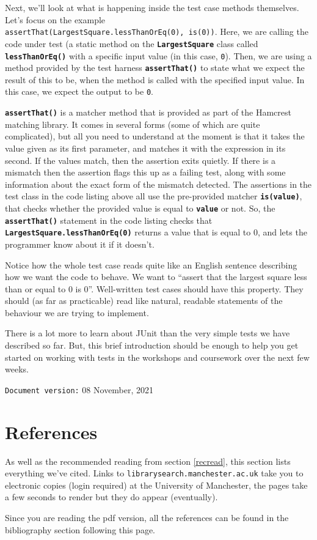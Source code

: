 \documentclass[
]{book}
\begin{document}
Next, we'll look at what is happening inside the test case methods themselves. Let's focus on the example \texttt{assertThat(LargestSquare.lessThanOrEq(0),\ is(0))}. Here, we are calling the code under test (a static method on the \textbf{\texttt{LargestSquare}} class called \textbf{\texttt{lessThanOrEq()}} with a specific input value (in this case, \texttt{0}). Then, we are using a method provided by the test harness \textbf{\texttt{assertThat()}} to state what we expect the result of this to be, when the method is called with the specified input value. In this case, we expect the output to be \texttt{0}.

\textbf{\texttt{assertThat()}} is a matcher method that is provided as part of the Hamcrest matching library. It comes in several forms (some of which are quite complicated), but all you need to understand at the moment is that it takes the value given as its first parameter, and matches it with the expression in its second. If the values match, then the assertion exits quietly. If there is a mismatch then the assertion flags this up as a failing test, along with some information about the exact form of the mismatch detected. The assertions in the test class in the code listing above all use the pre-provided matcher \textbf{\texttt{is(value)}}, that checks whether the provided value is equal to \textbf{\texttt{value}} or not. So, the \textbf{\texttt{assertThat()}} statement in the code listing checks that \textbf{\texttt{LargestSquare.lessThanOrEq(0)}} returns a value that is equal to 0, and lets the programmer know about it if it doesn't.

Notice how the whole test case reads quite like an English sentence describing how we want the code to behave. We want to ``assert that the largest square less than or equal to 0 is 0''. Well-written test cases should have this property. They should (as far as practicable) read like natural, readable statements of the behaviour we are trying to implement.

There is a lot more to learn about JUnit than the very simple tests we have described so far. But, this brief introduction should be enough to help you get started on working with tests in the workshops and coursework over the next few weeks.

\texttt{Document\ version:} 08 November, 2021

\hypertarget{reading}{%
\chapter{References}\label{reading}}

As well as the recommended reading from section \ref{recread}, this section lists everything we've cited. Links to \texttt{librarysearch.manchester.ac.uk} take you to electronic copies (login required) at the University of Manchester, the pages take a few seconds to render but they do appear (eventually).

Since you are reading the pdf version, all the references can be found in the bibliography section following this page.

  
\end{document}
